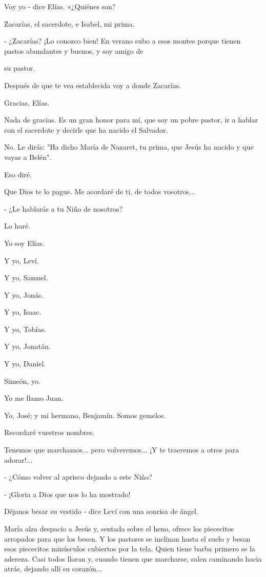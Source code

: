 \documentclass[12pt]{book} %
\begin{document}
Voy yo - dice Elías. «¿Quiénes son? 

Zacarías, el sacerdote, e Isabel, mi prima. 

- ¿Zacarías? ¡Lo conozco bien! En verano subo a esos montes porque tienen pastos abundantes y buenos, y soy amigo de 

su pastor. 

Después de que te vea establecida voy a donde Zacarías. 

Gracias, Elías. 

Nada de gracias. Es un gran honor para mí, que soy un pobre pastor, ir a hablar con el sacerdote y decirle que ha nacido el Salvador. 

No. Le dirás: "Ha dicho María de Nazaret, tu prima, que Jesús ha nacido y que vayas a Belén". 

Eso diré. 

Que Dios te lo pague. Me acordaré de ti, de todos vosotros... 

- ¿Le hablarás a tu Niño de nosotros? 

Lo haré. 

Yo soy Elías. 

Y yo, Leví. 

Y yo, Samuel. 

Y yo, Jonás. 

Y yo, Isaac. 

Y yo, Tobías. 

Y yo, Jonatán. 

Y yo, Daniel. 

Simeón, yo. 

Yo me llamo Juan. 

Yo, José; y mi hermano, Benjamín. Somos gemelos. 

Recordaré vuestros nombres. 

Tenemos que marchamos... pero volveremos... ¡Y te traeremos a otros para adorar!... 

- ¿Cómo volver al aprisco dejando a este Niño? 

- ¡Gloria a Dios que nos lo ha mostrado! 

Déjanos besar su vestido - dice Leví con una sonrisa de ángel. 

María alza despacio a Jesús y, sentada sobre el heno, ofrece los piececitos arropados para que los besen. Y los pastores se inclinan hasta el suelo y besan esos piececitos minúsculos cubiertos por la tela. Quien tiene barba primero se la adereza. Casi todos lloran y, cuando tienen que marcharse, salen caminando hacia atrás, dejando allí su corazón... 
\end{document}
